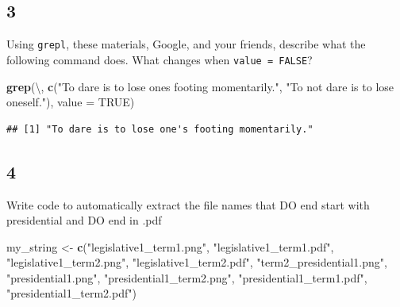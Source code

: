 \documentclass[
]{book}
\newenvironment{Shaded}{\begin{snugshade}}{\end{snugshade}}
\newcommand{\CharTok}[1]{\textcolor[rgb]{0.31,0.60,0.02}{#1}}
\newcommand{\DataTypeTok}[1]{\textcolor[rgb]{0.13,0.29,0.53}{#1}}
\newcommand{\KeywordTok}[1]{\textcolor[rgb]{0.13,0.29,0.53}{\textbf{#1}}}
\newcommand{\NormalTok}[1]{#1}
\newcommand{\OtherTok}[1]{\textcolor[rgb]{0.56,0.35,0.01}{#1}}
\newcommand{\StringTok}[1]{\textcolor[rgb]{0.31,0.60,0.02}{#1}}
\theoremstyle{definition}
\theoremstyle{definition}
\theoremstyle{definition}
\theoremstyle{remark}
\begin{document}
\hypertarget{section-19}{%
\subsection*{3}\label{section-19}}

Using \texttt{grepl}, these materials, Google, and your friends, describe what the following command does. What changes when \texttt{value\ =\ FALSE}?

\begin{Shaded}
\begin{Highlighting}[]
\KeywordTok{grep}\NormalTok{(}\StringTok{\textquotesingle{}}\CharTok{\textbackslash{}\textquotesingle{}}\StringTok{\textquotesingle{}}\NormalTok{, }
     \KeywordTok{c}\NormalTok{(}\StringTok{"To dare is to lose one\textquotesingle{}s footing momentarily."}\NormalTok{,  }\StringTok{"To not dare is to lose oneself."}\NormalTok{), }\DataTypeTok{value =} \OtherTok{TRUE}\NormalTok{)}
\end{Highlighting}
\end{Shaded}

\begin{verbatim}
## [1] "To dare is to lose one's footing momentarily."
\end{verbatim}

\hypertarget{section-20}{%
\subsection*{4}\label{section-20}}

Write code to automatically extract the file names that DO end start with presidential and DO end in .pdf

\begin{Shaded}
\begin{Highlighting}[]
\NormalTok{my\_string <{-}}\StringTok{ }\KeywordTok{c}\NormalTok{(}\StringTok{"legislative1\_term1.png"}\NormalTok{, }
               \StringTok{"legislative1\_term1.pdf"}\NormalTok{,}
               \StringTok{"legislative1\_term2.png"}\NormalTok{, }
               \StringTok{"legislative1\_term2.pdf"}\NormalTok{,}
               \StringTok{"term2\_presidential1.png"}\NormalTok{, }
               \StringTok{"presidential1.png"}\NormalTok{, }
               \StringTok{"presidential1\_term2.png"}\NormalTok{,}
               \StringTok{"presidential1\_term1.pdf"}\NormalTok{,}
               \StringTok{"presidential1\_term2.pdf"}\NormalTok{)}
\end{Highlighting}
\end{Shaded}
\end{document}
